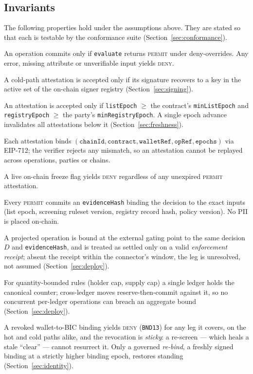 \documentclass[11pt,a4paper]{article}
\newcommand{\Iref}[1]{\textbf{I#1}}
\begin{document}
\subsection{Invariants}
The following properties hold under the assumptions above. They are stated so
that each is testable by the conformance suite (Section~\ref{sec:conformance}).
\begin{description}[leftmargin=2.4em,itemsep=2pt]
  \item[\Iref{1} Safety / fail-closed.] An operation commits only if
  \texttt{evaluate} returns \textsc{permit} under deny-overrides. Any error,
  missing attribute or unverifiable input yields \textsc{deny}.
  \item[\Iref{2} Authenticity.] A cold-path attestation is accepted only if its
  signature recovers to a key in the active set of the on-chain signer registry
  (Section~\ref{sec:signing}).
  \item[\Iref{3} Freshness.] An attestation is accepted only if
  \texttt{listEpoch} $\ge$ the contract's \texttt{minListEpoch} and
  \texttt{registryEpoch} $\ge$ the party's \texttt{minRegistryEpoch}. A single
  epoch advance invalidates all attestations below it (Section~\ref{sec:freshness}).
  \item[\Iref{4} Non-replay / domain separation.] Each attestation binds
  $(\texttt{chainId}, \texttt{contract}, \texttt{walletRef}, \texttt{opRef},
  \texttt{epochs})$ via EIP-712; the verifier rejects any mismatch, so an
  attestation cannot be replayed across operations, parties or chains.
  \item[\Iref{5} Freeze dominance.] A live on-chain freeze flag yields
  \textsc{deny} regardless of any unexpired \textsc{permit} attestation.
  \item[\Iref{6} Evidence.] Every \textsc{permit} commits an \texttt{evidenceHash}
  binding the decision to the exact inputs (list epoch, screening ruleset version,
  registry record hash, policy version). No PII is placed on-chain.
  \item[\Iref{7} Cross-ledger consistency.] A projected operation is bound at the
  external gating point to the same decision $D$ and \texttt{evidenceHash}, and is
  treated as settled only on a valid \emph{enforcement receipt}; absent the
  receipt within the connector's window, the leg is unresolved, not assumed
  (Section~\ref{sec:deploy}).
  \item[\Iref{8} Quantity correctness.] For quantity-bounded rules (holder cap,
  supply cap) a single ledger holds the canonical counter; cross-ledger moves
  reserve-then-commit against it, so no concurrent per-ledger operations can
  breach an aggregate bound (Section~\ref{sec:deploy}).
  \item[\Iref{9} Binding revocation.] A revoked wallet-to-BIC binding yields
  \textsc{deny} (\texttt{BND13}) for any leg it covers, on the hot and cold paths
  alike, and the revocation is \emph{sticky}: a re-screen --- which heals a stale
  ``clear'' --- cannot resurrect it. Only a governed \emph{re-bind}, a freshly
  signed binding at a strictly higher binding epoch, restores standing
  (Section~\ref{sec:identity}).
\end{description}
\end{document}
